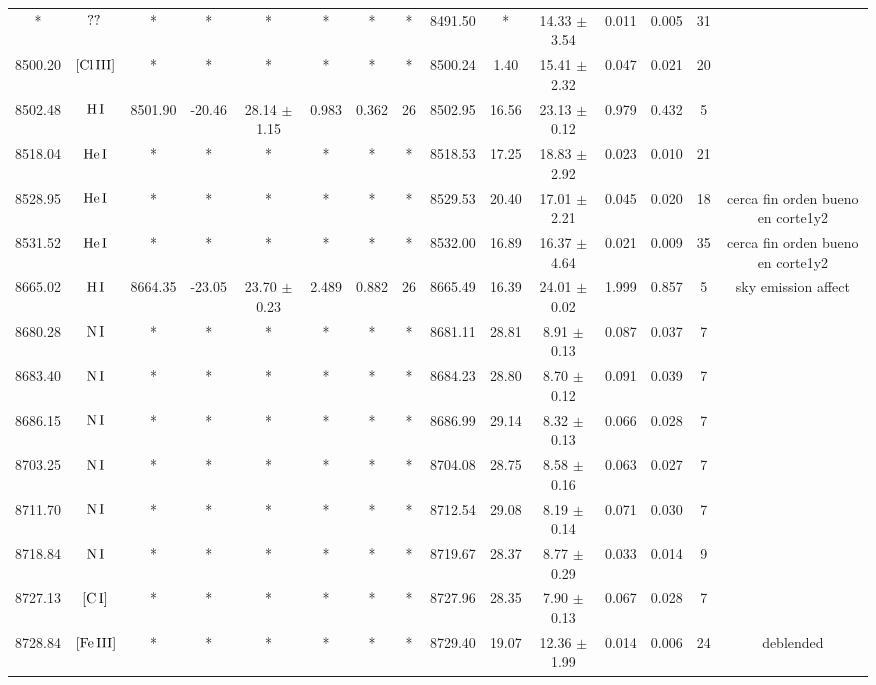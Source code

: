 \documentclass{article}
\begin{document}
\begin{table*}
\begin{adjustbox}{width=\textwidth}
\begin{tabular}{ccccccccccccccc}
* & $\mbox{??}\thinspace \mbox{}$ & * & * & * & * & * & * & 8491.50 & * & 14.33 $\pm$ 3.54 & 0.011 & 0.005 & 31 &  \\
8500.20 & $\mbox{[Cl}\thinspace \mbox{III]}$ & * & * & * & * & * & * & 8500.24 & 1.40 & 15.41 $\pm$ 2.32 & 0.047 & 0.021 & 20 &  \\
8502.48 & $\mbox{H}\thinspace \mbox{I}$ & 8501.90 & -20.46 & 28.14 $\pm$ 1.15 & 0.983 & 0.362 & 26 & 8502.95 & 16.56 & 23.13 $\pm$ 0.12 & 0.979 & 0.432 & 5 &  \\
8518.04 & $\mbox{He}\thinspace \mbox{I}$ & * & * & * & * & * & * & 8518.53 & 17.25 & 18.83 $\pm$ 2.92 & 0.023 & 0.010 & 21 &  \\
8528.95 & $\mbox{He}\thinspace \mbox{I}$ & * & * & * & * & * & * & 8529.53 & 20.40 & 17.01 $\pm$ 2.21 & 0.045 & 0.020 & 18 &  cerca fin orden bueno en corte1y2 \\
8531.52 & $\mbox{He}\thinspace \mbox{I}$ & * & * & * & * & * & * & 8532.00 & 16.89 & 16.37 $\pm$ 4.64 & 0.021 & 0.009 & 35 &  cerca fin orden bueno en corte1y2 \\
8665.02 & $\mbox{H}\thinspace \mbox{I}$ & 8664.35 & -23.05 & 23.70 $\pm$ 0.23 & 2.489 & 0.882 & 26 & 8665.49 & 16.39 & 24.01 $\pm$ 0.02 & 1.999 & 0.857 & 5 &  sky emission affect \\
8680.28 & $\mbox{N}\thinspace \mbox{I}$ & * & * & * & * & * & * & 8681.11 & 28.81 & 8.91 $\pm$ 0.13 & 0.087 & 0.037 & 7 &  \\
8683.40 & $\mbox{N}\thinspace \mbox{I}$ & * & * & * & * & * & * & 8684.23 & 28.80 & 8.70 $\pm$ 0.12 & 0.091 & 0.039 & 7 &  \\
8686.15 & $\mbox{N}\thinspace \mbox{I}$ & * & * & * & * & * & * & 8686.99 & 29.14 & 8.32 $\pm$ 0.13 & 0.066 & 0.028 & 7 &  \\
8703.25 & $\mbox{N}\thinspace \mbox{I}$ & * & * & * & * & * & * & 8704.08 & 28.75 & 8.58 $\pm$ 0.16 & 0.063 & 0.027 & 7 &  \\
8711.70 & $\mbox{N}\thinspace \mbox{I}$ & * & * & * & * & * & * & 8712.54 & 29.08 & 8.19 $\pm$ 0.14 & 0.071 & 0.030 & 7 &  \\
8718.84 & $\mbox{N}\thinspace \mbox{I}$ & * & * & * & * & * & * & 8719.67 & 28.37 & 8.77 $\pm$ 0.29 & 0.033 & 0.014 & 9 &  \\
8727.13 & $\mbox{[C}\thinspace \mbox{I]}$ & * & * & * & * & * & * & 8727.96 & 28.35 & 7.90 $\pm$ 0.13 & 0.067 & 0.028 & 7 &  \\
8728.84 & $\mbox{[Fe}\thinspace \mbox{III]}$ & * & * & * & * & * & * & 8729.40 & 19.07 & 12.36 $\pm$ 1.99 & 0.014 & 0.006 & 24 &  deblended \\

\end{tabular}
\end{adjustbox}
\end{table*}
\end{document}
